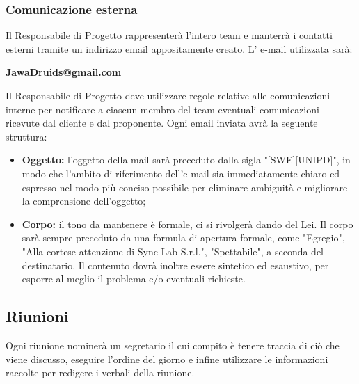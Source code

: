 \subsubsection{Comunicazione esterna}\label{4.1.2.2}
Il Responsabile di Progetto rappresenterà l'intero team e manterrà i contatti esterni tramite un indirizzo email appositamente creato.
L' e-mail utilizzata sarà: 
\begin{center}
	\textbf {JawaDruids@gmail.com}
\end{center}
Il Responsabile di Progetto deve utilizzare regole relative alle comunicazioni interne per notificare a ciascun membro del team eventuali comunicazioni ricevute dal cliente e dal proponente.
Ogni email inviata avrà la seguente struttura:
\begin{itemize}
\item \textbf{Oggetto:} l'oggetto della mail sarà preceduto dalla sigla "[SWE][UNIPD]", in modo che l'ambito di riferimento dell'e-mail sia immediatamente chiaro ed espresso nel modo più conciso possibile per eliminare ambiguità e migliorare la comprensione dell'oggetto;
	\item \textbf{Corpo:} il tono da mantenere è formale, ci si rivolgerà dando del Lei. Il corpo sarà sempre preceduto da una formula di apertura formale, come "Egregio", "Alla cortese attenzione di Sync Lab S.r.l.", "Spettabile", a seconda del destinatario.
	Il contenuto dovrà inoltre essere sintetico ed esaustivo, per esporre al meglio il problema e/o eventuali richieste.
\end{itemize}
\subsection{Riunioni}\label{4.1.3}
Ogni riunione nominerà un segretario il cui compito è tenere traccia di ciò che viene discusso, eseguire l'ordine del giorno e infine utilizzare le informazioni raccolte per redigere i verbali della riunione.
